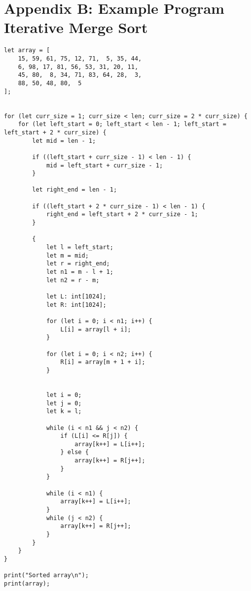 \documentclass[a4paper]{article}
\begin{document}
\clearpage
\section*{Appendix B: Example Program Iterative Merge Sort}

\begin{lstlisting}[language=DPCC]
let array = [
    15, 59, 61, 75, 12, 71,  5, 35, 44,
    6, 98, 17, 81, 56, 53, 31, 20, 11,
    45, 80,  8, 34, 71, 83, 64, 28,  3,
    88, 50, 48, 80,  5
];


for (let curr_size = 1; curr_size < len; curr_size = 2 * curr_size) {
    for (let left_start = 0; left_start < len - 1; left_start = left_start + 2 * curr_size) {
        let mid = len - 1;

        if ((left_start + curr_size - 1) < len - 1) {
            mid = left_start + curr_size - 1;
        }

        let right_end = len - 1;

        if ((left_start + 2 * curr_size - 1) < len - 1) {
            right_end = left_start + 2 * curr_size - 1;
        }

        {
            let l = left_start;
            let m = mid;
            let r = right_end;
            let n1 = m - l + 1;
            let n2 = r - m;

            let L: int[1024];
            let R: int[1024];

            for (let i = 0; i < n1; i++) {
                L[i] = array[l + i];
            }

            for (let i = 0; i < n2; i++) {
                R[i] = array[m + 1 + i];
            }


            let i = 0;
            let j = 0;
            let k = l;

            while (i < n1 && j < n2) {
                if (L[i] <= R[j]) {
                    array[k++] = L[i++];
                } else {
                    array[k++] = R[j++];
                }
            }

            while (i < n1) {
                array[k++] = L[i++];
            }
            while (j < n2) {
                array[k++] = R[j++];
            }
        }
    }
}

print("Sorted array\n");
print(array);
\end{lstlisting}


%

%
\end{document}
